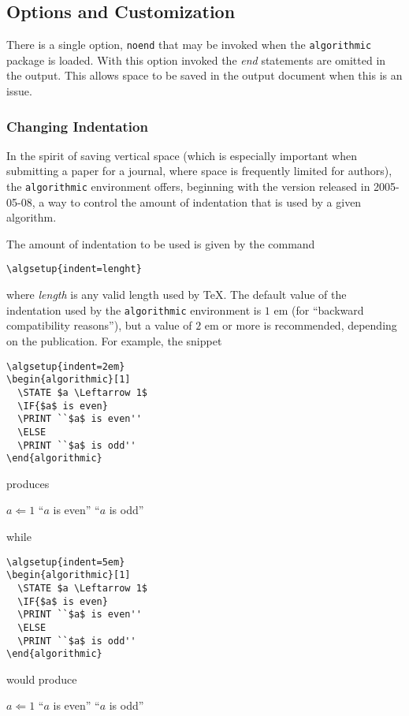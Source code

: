\documentclass{article}
\newcommand{\keyword}[1]{\texttt{#1}}
\begin{document}
\subsection{Options and Customization}

There is a single option, \keyword{noend}\label{kwd:noend} that may be
invoked when the \texttt{algorithmic} package is loaded.  With this option
invoked the \emph{end} statements are omitted in the output.  This allows
space to be saved in the output document when this is an issue.

\subsubsection{Changing Indentation}
\label{sec:changing-indentation}
In the spirit of saving vertical space (which is especially important when
submitting a paper for a journal, where space is frequently limited for
authors), the \keyword{algorithmic} environment offers, beginning with the
version released in 2005-05-08, a way to control the amount of indentation
that is used by a given algorithm.

The amount of indentation to be used is given by the command
\begin{verbatim}
\algsetup{indent=lenght}
\end{verbatim}
where \emph{length} is any valid length used by \TeX. The default value of
the indentation used by the \keyword{algorithmic} environment is $1$ em
(for ``backward compatibility reasons''), but a value of $2$ em or more is
recommended, depending on the publication. For example, the snippet
\begin{verbatim}
\algsetup{indent=2em}
\begin{algorithmic}[1]
  \STATE $a \Leftarrow 1$
  \IF{$a$ is even}
  \PRINT ``$a$ is even''
  \ELSE
  \PRINT ``$a$ is odd''
\end{algorithmic}
\end{verbatim}
produces
\begin{algorithmic}[1]
  \STATE $a \Leftarrow 1$
  \PRINT ``$a$ is even''
  \ELSE
  \PRINT ``$a$ is odd''
  \ENDIF
\end{algorithmic}
while
\begin{verbatim}
\algsetup{indent=5em}
\begin{algorithmic}[1]
  \STATE $a \Leftarrow 1$
  \IF{$a$ is even}
  \PRINT ``$a$ is even''
  \ELSE
  \PRINT ``$a$ is odd''
\end{algorithmic}
\end{verbatim}
would produce
\begin{algorithmic}[1]
  \STATE $a \Leftarrow 1$
  \PRINT ``$a$ is even''
  \ELSE
  \PRINT ``$a$ is odd''
  \ENDIF
\end{algorithmic}
\end{document}
